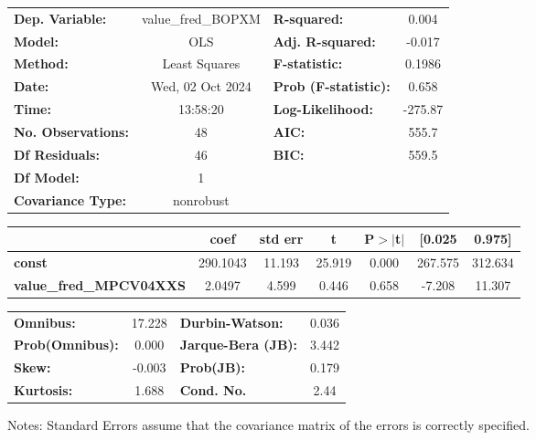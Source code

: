 \begin{center}
\begin{tabular}{lclc}
\toprule
\textbf{Dep. Variable:}         & value\_fred\_BOPXM & \textbf{  R-squared:         } &     0.004   \\
\textbf{Model:}                 &        OLS         & \textbf{  Adj. R-squared:    } &    -0.017   \\
\textbf{Method:}                &   Least Squares    & \textbf{  F-statistic:       } &    0.1986   \\
\textbf{Date:}                  &  Wed, 02 Oct 2024  & \textbf{  Prob (F-statistic):} &    0.658    \\
\textbf{Time:}                  &      13:58:20      & \textbf{  Log-Likelihood:    } &   -275.87   \\
\textbf{No. Observations:}      &           48       & \textbf{  AIC:               } &     555.7   \\
\textbf{Df Residuals:}          &           46       & \textbf{  BIC:               } &     559.5   \\
\textbf{Df Model:}              &            1       & \textbf{                     } &             \\
\textbf{Covariance Type:}       &     nonrobust      & \textbf{                     } &             \\
\bottomrule
\end{tabular}
\begin{tabular}{lcccccc}
                                & \textbf{coef} & \textbf{std err} & \textbf{t} & \textbf{P$> |$t$|$} & \textbf{[0.025} & \textbf{0.975]}  \\
\midrule
\textbf{const}                  &     290.1043  &       11.193     &    25.919  &         0.000        &      267.575    &      312.634     \\
\textbf{value\_fred\_MPCV04XXS} &       2.0497  &        4.599     &     0.446  &         0.658        &       -7.208    &       11.307     \\
\bottomrule
\end{tabular}
\begin{tabular}{lclc}
\textbf{Omnibus:}       & 17.228 & \textbf{  Durbin-Watson:     } &    0.036  \\
\textbf{Prob(Omnibus):} &  0.000 & \textbf{  Jarque-Bera (JB):  } &    3.442  \\
\textbf{Skew:}          & -0.003 & \textbf{  Prob(JB):          } &    0.179  \\
\textbf{Kurtosis:}      &  1.688 & \textbf{  Cond. No.          } &     2.44  \\
\bottomrule
\end{tabular}
\end{center}

Notes: \newline
 [1] Standard Errors assume that the covariance matrix of the errors is correctly specified.